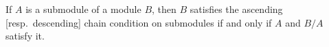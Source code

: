 If $A$ is a submodule of a module $B$, then $B$ satisfies the ascending [resp.\ descending] chain condition on submodules if and only if $A$ and $B/A$ satisfy it.
